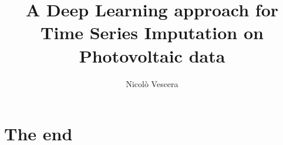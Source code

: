 \documentclass{beamer}
\title{A Deep Learning approach for Time Series Imputation on Photovoltaic data}
\date{\DTMusedate{mydate}}
\author{Nicolò Vescera}
\institute{Università degli Studi di Perugia}
\begin{document}
\maketitle









\section{The end}
\end{document}

